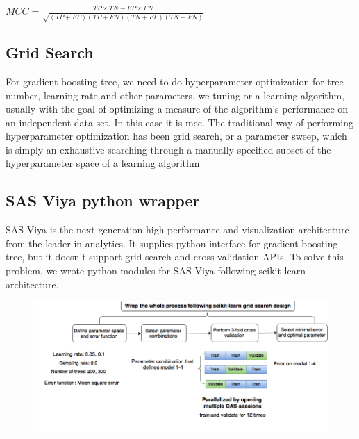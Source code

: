 \documentclass{article}
\begin{document}
$MCC =\frac{TP \times TN-FP\times FN}{\sqrt{(TP+FP)(TP+FN)(TN+FP)(TN+FN)}}$

\subsection{Grid Search}
For gradient boosting tree, we need to do hyperparameter optimization for tree number, learning rate and other parameters. we tuning or a learning algorithm, usually with the goal of optimizing a measure of the algorithm's performance on an independent data set. In this case it is mcc.  The traditional way of performing hyperparameter optimization has been grid search, or a parameter sweep, which is simply an exhaustive searching through a manually specified subset of the hyperparameter space of a learning algorithm


\subsection{SAS Viya python wrapper}
SAS Viya is the next-generation high-performance and visualization architecture from the leader in analytics. It supplies python interface for gradient boosting tree, but it doesn't support grid search and cross validation APIs. To solve this problem, we wrote python modules for SAS Viya following scikit-learn architecture.
\begin{figure}[h]
\includegraphics[width=12.5cm]{HyperparameterOptimization.png}
\end{figure}


\end{document}
